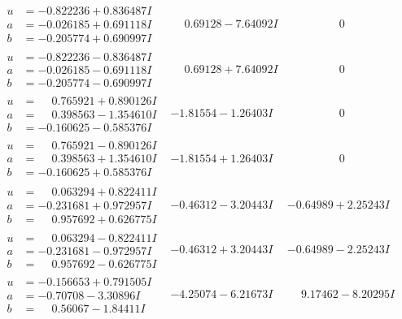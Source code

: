 \documentclass[1p]{elsarticle_modified}
\theoremstyle{definition}
\begin{document}
$$\begin{array}{c|c|c}
\begin{aligned}
u &= -0.822236 + 0.836487 I \\
a &= -0.026185 + 0.691118 I \\
b &= -0.205774 + 0.690997 I\end{aligned}
 & \phantom{-}0.69128 - 7.64092 I & \phantom{-0.000000 } 0 \\ \hline\begin{aligned}
u &= -0.822236 - 0.836487 I \\
a &= -0.026185 - 0.691118 I \\
b &= -0.205774 - 0.690997 I\end{aligned}
 & \phantom{-}0.69128 + 7.64092 I & \phantom{-0.000000 } 0 \\ \hline\begin{aligned}
u &= \phantom{-}0.765921 + 0.890126 I \\
a &= \phantom{-}0.398563 - 1.354610 I \\
b &= -0.160625 - 0.585376 I\end{aligned}
 & -1.81554 - 1.26403 I & \phantom{-0.000000 } 0 \\ \hline\begin{aligned}
u &= \phantom{-}0.765921 - 0.890126 I \\
a &= \phantom{-}0.398563 + 1.354610 I \\
b &= -0.160625 + 0.585376 I\end{aligned}
 & -1.81554 + 1.26403 I & \phantom{-0.000000 } 0 \\ \hline\begin{aligned}
u &= \phantom{-}0.063294 + 0.822411 I \\
a &= -0.231681 + 0.972957 I \\
b &= \phantom{-}0.957692 + 0.626775 I\end{aligned}
 & -0.46312 - 3.20443 I & -0.64989 + 2.25243 I \\ \hline\begin{aligned}
u &= \phantom{-}0.063294 - 0.822411 I \\
a &= -0.231681 - 0.972957 I \\
b &= \phantom{-}0.957692 - 0.626775 I\end{aligned}
 & -0.46312 + 3.20443 I & -0.64989 - 2.25243 I \\ \hline\begin{aligned}
u &= -0.156653 + 0.791505 I \\
a &= -0.70708 - 3.30896 I \\
b &= \phantom{-}0.56067 - 1.84411 I\end{aligned}
 & -4.25074 - 6.21673 I & \phantom{-}9.17462 - 8.20295 I \\ \hline\begin{aligned}

\end{aligned}
\end{array}$$
\end{document}
